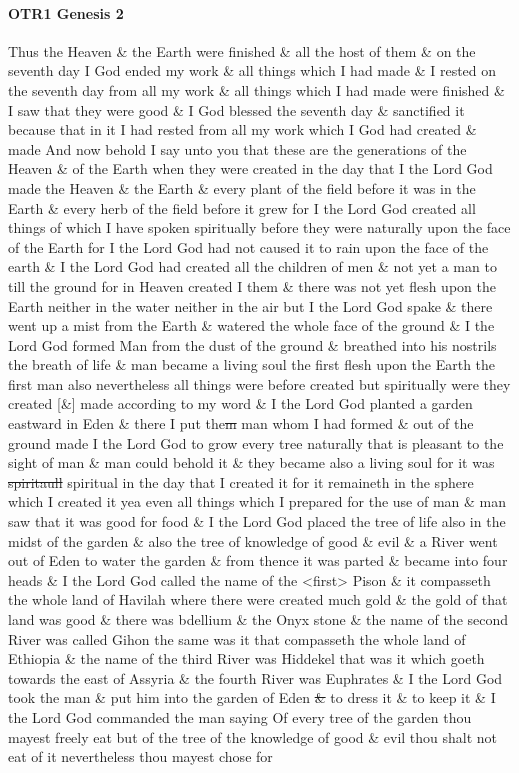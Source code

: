 	\paragraph{OTR1 Genesis 2}
		\label{JST-OTR1-GENESIS-2}
		
		Thus the Heaven \& the Earth were finished \& all the host of them \& on the seventh day I God ended my work \& all things which I had made \& I rested on the seventh day from all my work \& all things which I had made were finished \& I saw that they were good \& I God blessed the seventh day \& sanctified it because that in it I had rested from all my work which I God had created \& made And now behold I say unto you that these are the generations of the Heaven \& of the Earth when they were created in the day that I the Lord God made the Heaven \& the Earth \& every plant of the field before it was in the Earth \& every herb of the field before it grew for I the Lord God created all things of which I have spoken spiritually before they were naturally upon the face of the Earth for I the Lord God had not caused it to rain upon the face of the earth \& I the Lord God had created all the children of men \& not yet a man to till the ground for in Heaven created I them \& there was not yet flesh upon the Earth neither in the water neither in the air but I the Lord God spake \& there went up a mist from the Earth \& watered the whole face of the ground \& I the Lord God formed Man from the dust of the ground \& breathed into his nostrils the breath of life \& man became a living soul the first flesh upon the Earth the first man also nevertheless all things were before created but spiritually were they created [\&] made according to my word \& I the Lord God planted a garden eastward in Eden \& there I put the\sout{m} man whom I had formed \& out of the ground made I the Lord God to grow every tree naturally that is pleasant to the sight of man \& man could behold it \& they became also a living soul for it was \sout{spiritaull} spiritual in the day that I created it for it remaineth in the sphere which I created it yea even all things which I prepared for the use of man \& man saw that it was good for food \& I the Lord God placed the tree of life also in the midst of the garden \& also the tree of knowledge of good \& evil \& a River went out of Eden to water the garden \& from thence it was parted \& became into four heads \& I the Lord God called the name of the <first> Pison \& it compasseth the whole land of Havilah where there were created much gold \& the gold of that land was good \& there was bdellium \& the Onyx stone \& the name of the second River was called Gihon the same was it that compasseth the whole land of Ethiopia \& the name of the third River was Hiddekel that was it which goeth towards the east of Assyria \& the fourth River was Euphrates \& I the Lord God took the man \& put him into the garden of Eden \sout{\&} to dress it \& to keep it \& I the Lord God commanded the man saying Of every tree of the garden thou mayest freely eat but of the tree of the knowledge of good \& evil thou shalt not eat of it nevertheless thou mayest chose for 